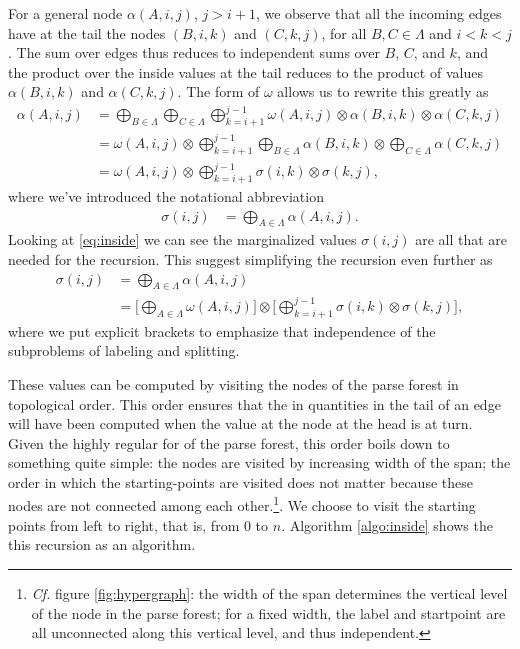   For a general node $\alpha(A, i, j)$, $j > i + 1$, we observe that all the incoming edges have at the tail the nodes $(B, i, k)$ and $(C, k, j)$, for all $B, C \in \Lambda$ and $i < k < j$. The sum over edges thus reduces to independent sums over $B$, $C$, and $k$, and the product over the inside values at the tail reduces to the product of values $\alpha(B, i, k)$ and $\alpha(C, k, j)$. The form of $\omega$ allows us to rewrite this greatly as
  \begin{align}
    \label{eq:inside}
    \alpha(A, i, j)
      &= \bigoplus_{B \in \Lambda} \bigoplus_{C \in \Lambda} \bigoplus_{k=i+1}^{j-1} \omega(A, i, j) \otimes \alpha(B,i,k) \otimes \alpha(C,k,j) \nonumber \\
      &= \omega(A, i, j) \otimes \bigoplus_{k=i+1}^{j-1} \bigoplus_{B \in \Lambda} \alpha(B,i,k) \otimes \bigoplus_{C \in \Lambda} \alpha(C,k,j) \nonumber \\
      &= \omega(A, i, j) \otimes \bigoplus_{k=i+1}^{j-1} \sigma(i,k) \otimes \sigma(k,j),
  \end{align}
  where we've introduced the notational abbreviation
  \begin{align*}
      \sigma(i,j) &= \bigoplus_{A \in \Lambda} \alpha(A,i,j).
  \end{align*}
  Looking at \ref{eq:inside} we can see the marginalized values $\sigma(i, j)$ are all that are needed for the recursion. This suggest simplifying the recursion even further as
  \begin{align}
    \label{eq:inside-simplified}
    \sigma(i, j)
      &= \bigoplus_{A \in \Lambda} \alpha(A,i,j) \nonumber \\
      &= \Bigg[ \bigoplus_{A \in \Lambda} \omega(A, i, j) \Bigg] \otimes \Bigg[\bigoplus_{k=i+1}^{j-1} \sigma(i,k) \otimes  \sigma(k,j) \Bigg],
  \end{align}
  where we put explicit brackets to emphasize that independence of the subproblems of labeling and splitting.

  These values can be computed by visiting the nodes of the parse forest in topological order. This order ensures that the in quantities in the tail of an edge will have been computed when the value at the node at the head is at turn. Given the highly regular for of the parse forest, this order boils down to something quite simple: the nodes are visited by increasing width of the span; the order in which the starting-points are visited does not matter because these nodes are not connected among each other.\footnote{\textit{Cf.} figure \ref{fig:hypergraph}: the width of the span determines the vertical level of the node in the parse forest; for a fixed width, the label and startpoint are all unconnected along this vertical level, and thus independent.}. We choose to visit the starting points from left to right, that is, from 0 to $n$. Algorithm \ref{algo:inside} shows the this recursion as an algorithm.


